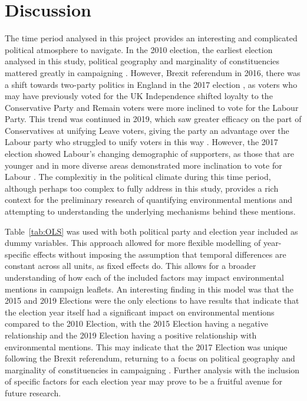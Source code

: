 \documentclass[preprint,12pt,authoryear]{elsarticle}
\begin{document}
\section{Discussion}


The time period analysed in this project provides an interesting and complicated political atmosphere to navigate. In the 2010 election, the earliest election analysed in this study, political geography and marginality of constituencies mattered greatly in campaigning \citep{johnstonLearningElectoralGeography2013}. However, Brexit referendum in 2016, there was a shift towards two-party politics in England in the 2017 election \citep{hoboltBrexit2017UK2018,prosserStrangeDeathMultiparty2018}, as voters who may have previously voted for the UK Independence shifted loyalty to the Conservative Party and Remain voters were more inclined to vote for the Labour Party. This trend was continued in 2019, which saw greater efficacy on the part of Conservatives at unifying Leave voters, giving the party an advantage over the Labour party who struggled to unify voters in this way \citep{cuttsBrexit2019General2020}. However, the 2017 election showed Labour's changing demographic of supporters, as those that are younger and in more diverse areas demonstrated more inclination to vote for Labour \citep{heath2017GeneralElection2017}. The complexitiy in the political climate during this time period, although perhaps too complex to fully address in this study, provides a rich context for the preliminary research of quantifying environmental mentions and attempting to understanding the underlying mechanisms behind these mentions.

Table~\ref{tab:OLS} was used with both political party and election year included as dummy variables. This approach allowed for more flexible modelling of year-specific effects without imposing the assumption that temporal differences are constant across all units, as fixed effects do. This allows for a broader understanding of how each of the included factors may impact environmental mentions in campaign leaflets. An interesting finding in this model was that the 2015 and 2019 Elections were the only elections to have results that indicate that the election year itself had a significant impact on environmental mentions compared to the 2010 Election, with the 2015 Election having a negative relationship and the 2019 Election having a positive relationship with environmental mentions. This may indicate that the 2017 Election was unique following the Brexit referendum, returning to a focus on political geography and marginality of constituencies in campaigning \citep{johnstonLearningElectoralGeography2013}. Further analysis with the inclusion of specific factors for each election year may prove to be a fruitful avenue for future research.
\end{document}
